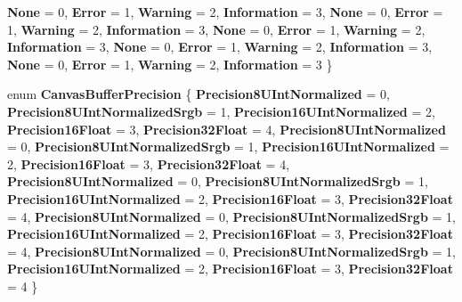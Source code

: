 \begin{DoxyCompactItemize}
{\bfseries None} = 0, 
{\bfseries Error} = 1, 
{\bfseries Warning} = 2, 
{\bfseries Information} = 3, 
\newline
{\bfseries None} = 0, 
{\bfseries Error} = 1, 
{\bfseries Warning} = 2, 
{\bfseries Information} = 3, 
\newline
{\bfseries None} = 0, 
{\bfseries Error} = 1, 
{\bfseries Warning} = 2, 
{\bfseries Information} = 3, 
\newline
{\bfseries None} = 0, 
{\bfseries Error} = 1, 
{\bfseries Warning} = 2, 
{\bfseries Information} = 3, 
\newline
{\bfseries None} = 0, 
{\bfseries Error} = 1, 
{\bfseries Warning} = 2, 
{\bfseries Information} = 3
 \}
\item 
\mbox{\label{namespace_microsoft_1_1_graphics_1_1_canvas_a9383a4c9a246b43c162a06fc29843c53}} 
enum {\bfseries Canvas\+Buffer\+Precision} \{ \newline
{\bfseries Precision8\+U\+Int\+Normalized} = 0, 
{\bfseries Precision8\+U\+Int\+Normalized\+Srgb} = 1, 
{\bfseries Precision16\+U\+Int\+Normalized} = 2, 
{\bfseries Precision16\+Float} = 3, 
\newline
{\bfseries Precision32\+Float} = 4, 
{\bfseries Precision8\+U\+Int\+Normalized} = 0, 
{\bfseries Precision8\+U\+Int\+Normalized\+Srgb} = 1, 
{\bfseries Precision16\+U\+Int\+Normalized} = 2, 
\newline
{\bfseries Precision16\+Float} = 3, 
{\bfseries Precision32\+Float} = 4, 
{\bfseries Precision8\+U\+Int\+Normalized} = 0, 
{\bfseries Precision8\+U\+Int\+Normalized\+Srgb} = 1, 
\newline
{\bfseries Precision16\+U\+Int\+Normalized} = 2, 
{\bfseries Precision16\+Float} = 3, 
{\bfseries Precision32\+Float} = 4, 
{\bfseries Precision8\+U\+Int\+Normalized} = 0, 
\newline
{\bfseries Precision8\+U\+Int\+Normalized\+Srgb} = 1, 
{\bfseries Precision16\+U\+Int\+Normalized} = 2, 
{\bfseries Precision16\+Float} = 3, 
{\bfseries Precision32\+Float} = 4, 
\newline
{\bfseries Precision8\+U\+Int\+Normalized} = 0, 
{\bfseries Precision8\+U\+Int\+Normalized\+Srgb} = 1, 
{\bfseries Precision16\+U\+Int\+Normalized} = 2, 
{\bfseries Precision16\+Float} = 3, 
\newline
{\bfseries Precision32\+Float} = 4
 \}
\item 
\mbox{\label{namespace_microsoft_1_1_graphics_1_1_canvas_a912d98ef415ce79b96eeb1280290df73}} 

\end{DoxyCompactItemize}
